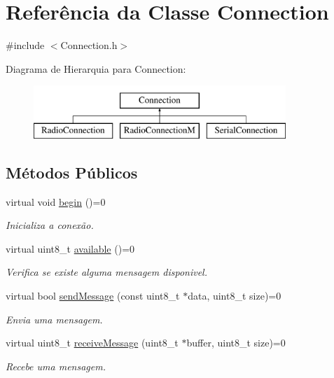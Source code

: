 \hypertarget{classConnection}{\section{Referência da Classe Connection}
\label{classConnection}
}


{\ttfamily \#include $<$Connection.\-h$>$}

Diagrama de Hierarquia para Connection\-:\begin{figure}[H]
\begin{center}
\leavevmode
\includegraphics[height=2.000000cm]{classConnection}
\end{center}
\end{figure}
\subsection*{Métodos Públicos}
\begin{DoxyCompactItemize}
\item 
virtual void \hyperlink{classConnection_a2e5c7e67928fac5fea45e56c11d1ed31}{begin} ()=0
\begin{DoxyCompactList}\small\item\em Inicializa a conexão. \end{DoxyCompactList}\item 
virtual uint8\-\_\-t \hyperlink{classConnection_acd5ee426481b2aca2903d96f6f807341}{available} ()=0
\begin{DoxyCompactList}\small\item\em Verifica se existe alguma mensagem disponivel. \end{DoxyCompactList}\item 
virtual bool \hyperlink{classConnection_aa03e632ed6b812d915fd40dccd18a080}{send\-Message} (const uint8\-\_\-t $\ast$data, uint8\-\_\-t size)=0
\begin{DoxyCompactList}\small\item\em Envia uma mensagem. \end{DoxyCompactList}\item 
virtual uint8\-\_\-t \hyperlink{classConnection_a315961bc8327f38e4f4e09b832fc60a1}{receive\-Message} (uint8\-\_\-t $\ast$buffer, uint8\-\_\-t size)=0
\begin{DoxyCompactList}\small\item\em Recebe uma mensagem. \end{DoxyCompactList}\end{DoxyCompactItemize}


